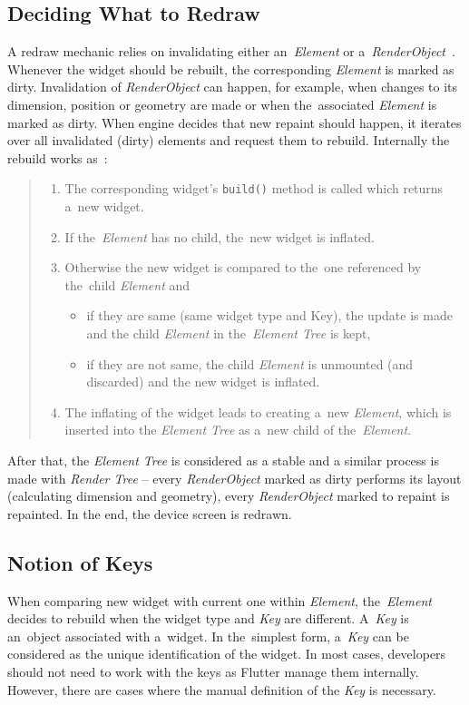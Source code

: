 \subsection{Deciding What to Redraw}
A redraw mechanic relies on invalidating either an~\textit{Element} or a~\textit{RenderObject}~\cite{didier-internals}. Whenever the widget should be rebuilt, the corresponding \textit{Element} is marked as dirty. Invalidation of \textit{RenderObject} can happen, for example, when changes to its dimension, position or geometry are made or when the~associated \textit{Element} is marked as dirty. When engine decides that new repaint should happen, it iterates over all invalidated (dirty) elements and request them to rebuild. Internally the rebuild works as~\cite{didier-internals}:
\begin{quote}
    \begin{enumerate}
    \item The corresponding widget's \verb|build()| method is called which returns a~new widget.
    \item If the~\textit{Element} has no child, the~new widget is inflated.
    \item Otherwise the new widget is compared to the~one referenced by the~child \textit{Element} and
        \begin{itemize}
        \item if they are same (same widget type and Key), the update is made and the child \textit{Element} in the~\textit{Element Tree} is kept,
        \item if they are not same, the child \textit{Element} is unmounted (and discarded) and the new widget is inflated.
        \end{itemize}
    \item The inflating of the widget leads to creating a~new \textit{Element}, which is inserted into the \textit{Element Tree} as a~new child of the~\textit{Element}. 
    \end{enumerate}
\end{quote}

After that, the \textit{Element Tree} is considered as a stable and a similar process is made with \textit{Render Tree} -- every \textit{RenderObject} marked as dirty performs its layout (calculating dimension and geometry), every \textit{RenderObject} marked to repaint is repainted. In the end, the device screen is redrawn. 
\subsection{Notion of Keys}
When comparing new widget with current one within \textit{Element}, the~\textit{Element} decides to rebuild when the widget type and \textit{Key} are different. A~\textit{Key} is an~object associated with a~widget. In the~simplest form, a~\textit{Key} can be considered as the unique identification of the widget. In most cases, developers should not need to work with the keys as Flutter manage them internally. However, there are cases where the manual definition of the \textit{Key} is necessary. 

